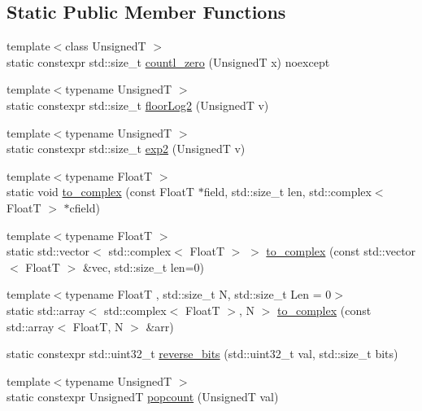 \subsection*{Static Public Member Functions}
\begin{DoxyCompactItemize}
\item 
{\footnotesize template$<$class UnsignedT $>$ }\\static constexpr std\+::size\+\_\+t \hyperlink{structdevfix_1_1base_1_1math_ab1781c7edecc9c462f16335f534b2470}{countl\+\_\+zero} (UnsignedT x) noexcept
\item 
{\footnotesize template$<$typename UnsignedT $>$ }\\static constexpr std\+::size\+\_\+t \hyperlink{structdevfix_1_1base_1_1math_a3ea732698f7ebf65df433de95721a6c1}{floor\+Log2} (UnsignedT v)
\item 
{\footnotesize template$<$typename UnsignedT $>$ }\\static constexpr std\+::size\+\_\+t \hyperlink{structdevfix_1_1base_1_1math_a4aa317a84af4eb10be4474c90cb47afe}{exp2} (UnsignedT v)
\item 
{\footnotesize template$<$typename FloatT $>$ }\\static void \hyperlink{structdevfix_1_1base_1_1math_a212f0b2e675de08688438e5bafb450c7}{to\+\_\+complex} (const FloatT $\ast$field, std\+::size\+\_\+t len, std\+::complex$<$ FloatT $>$ $\ast$cfield)
\item 
{\footnotesize template$<$typename FloatT $>$ }\\static std\+::vector$<$ std\+::complex$<$ FloatT $>$ $>$ \hyperlink{structdevfix_1_1base_1_1math_ace2cb831db8aeccad7108bc411612544}{to\+\_\+complex} (const std\+::vector$<$ FloatT $>$ \&vec, std\+::size\+\_\+t len=0)
\item 
{\footnotesize template$<$typename FloatT , std\+::size\+\_\+t N, std\+::size\+\_\+t Len = 0$>$ }\\static std\+::array$<$ std\+::complex$<$ FloatT $>$, N $>$ \hyperlink{structdevfix_1_1base_1_1math_aa125625a1d4063dc4bd4de82f7367f14}{to\+\_\+complex} (const std\+::array$<$ FloatT, N $>$ \&arr)
\item 
static constexpr std\+::uint32\+\_\+t \hyperlink{structdevfix_1_1base_1_1math_af3260ac1a62b3e9f6feb0f212aa8f796}{reverse\+\_\+bits} (std\+::uint32\+\_\+t val, std\+::size\+\_\+t bits)
\item 
{\footnotesize template$<$typename UnsignedT $>$ }\\static constexpr UnsignedT \hyperlink{structdevfix_1_1base_1_1math_ac3c5661a2ec82e7ae00e899c2a3d2049}{popcount} (UnsignedT val)
\end{DoxyCompactItemize}


